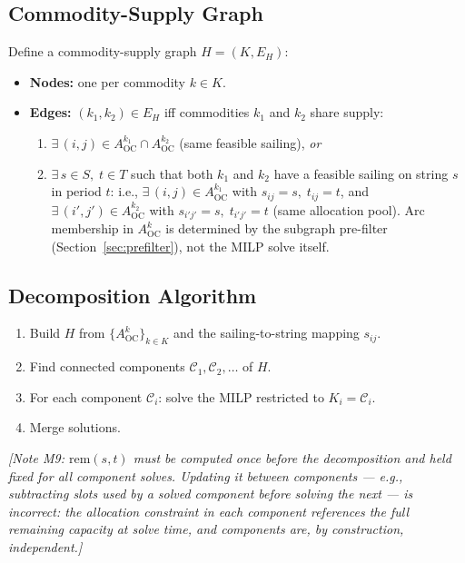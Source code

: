 \documentclass[11pt,a4paper]{article}
\theoremstyle{definition}
\begin{document}
\subsection{Commodity-Supply Graph}

Define a commodity-supply graph $H = (K, E_H)$:
\begin{itemize}[noitemsep]
  \item \textbf{Nodes:} one per commodity $k \in K$.
  \item \textbf{Edges:} $(k_1, k_2) \in E_H$ iff commodities $k_1$ and $k_2$ share supply:
    \begin{enumerate}[noitemsep]
      \item $\exists\, (i,j) \in A^{k_1}_{\text{OC}} \cap A^{k_2}_{\text{OC}}$ (same feasible sailing), \textit{or}
      \item $\exists\, s \in S,\; t \in T$ such that both $k_1$ and $k_2$ have a feasible
            sailing on string $s$ in period $t$: i.e., $\exists\,(i,j) \in A^{k_1}_{\text{OC}}$
            with $s_{ij}=s,\; t_{ij}=t$, and $\exists\,(i',j') \in A^{k_2}_{\text{OC}}$
            with $s_{i'j'}=s,\; t_{i'j'}=t$ (same allocation pool). Arc membership in
            $A^k_{\text{OC}}$ is determined by the subgraph pre-filter
            (Section~\ref{sec:prefilter}), not the MILP solve itself.
    \end{enumerate}
\end{itemize}

\subsection{Decomposition Algorithm}

\begin{enumerate}[noitemsep]
  \item Build $H$ from $\{A^k_{\text{OC}}\}_{k \in K}$ and the sailing-to-string mapping $s_{ij}$.
  \item Find connected components $\mathcal{C}_1, \mathcal{C}_2, \ldots$ of $H$.
  \item For each component $\mathcal{C}_i$: solve the MILP restricted to $K_i = \mathcal{C}_i$.
  \item Merge solutions.
\end{enumerate}

\textit{[Note M9: $\text{rem}(s,t)$ must be computed once before the decomposition and
held fixed for all component solves. Updating it between components --- e.g., subtracting
slots used by a solved component before solving the next --- is incorrect: the allocation
constraint in each component references the full remaining capacity at solve time, and
components are, by construction, independent.]}
\end{document}
